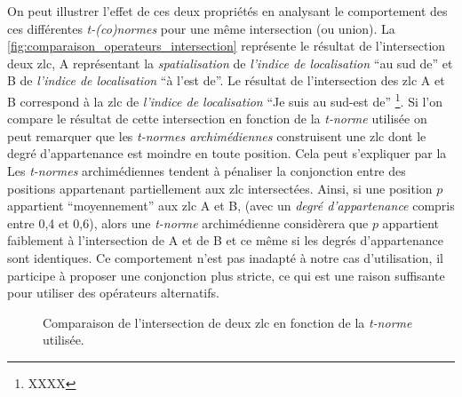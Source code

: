 
On peut illustrer l'effet de ces deux propriétés en analysant le
comportement des ces différentes \emph{t-(co)normes} pour une même
intersection (ou union). La
\autoref{fig:comparaison_operateurs_intersection} représente le
résultat de l'intersection deux \ac{zlc},
\textcolor{RdBu-9-1}{\textsf{A}} représentant la \emph{spatialisation}
de \emph{l'indice de localisation} \enquote{au sud de} et
\textcolor{RdBu-9-9}{\textsf{B}} de \emph{l'indice de localisation}
\enquote{à l'est de}. Le résultat de l'intersection des \ac{zlc}
\textcolor{RdBu-9-1}{\textsf{A}} et \textcolor{RdBu-9-9}{\textsf{B}}
correspond à la \ac{zlc} de \emph{l'indice de localisation}
\enquote{Je suis au sud-est de} \footnote{XXXX}. Si l'on compare le
résultat de cette intersection en fonction de la \emph{t-norme}
utilisée on peut remarquer que les \emph{t-normes archimédiennes}
construisent une \ac{zlc} dont le degré d'appartenance est moindre en
toute position. Cela peut s'expliquer par la
%
Les \emph{t-normes} archimédiennes tendent à pénaliser la conjonction
entre des positions appartenant partiellement aux \ac{zlc}
intersectées. Ainsi, si une position \(p\) appartient
\enquote{moyennement} aux \ac{zlc} \textcolor{RdBu-9-1}{\textsf{A}} et
\textcolor{RdBu-9-9}{\textsf{B}}, (\eg avec un \emph{degré
  d’appartenance} compris entre 0,4 et 0,6), alors une \emph{t-norme}
archimédienne considèrera que \(p\) appartient faiblement à
l'intersection de \textcolor{RdBu-9-1}{\textsf{A}} et de
\textcolor{RdBu-9-9}{\textsf{B}} et ce même si les degrés
d'appartenance sont identiques.
%
Ce comportement n'est pas
inadapté à notre cas d'utilisation, il participe à proposer une
conjonction plus stricte, ce qui est une raison suffisante pour
utiliser des opérateurs alternatifs.

\begin{figure}
  \centering
  
  \caption{Comparaison de l'intersection de deux \ac{zlc} en fonction
    de la \emph{t-norme} utilisée.}
  \label{fig:comparaison_operateurs_intersection}
\end{figure}

